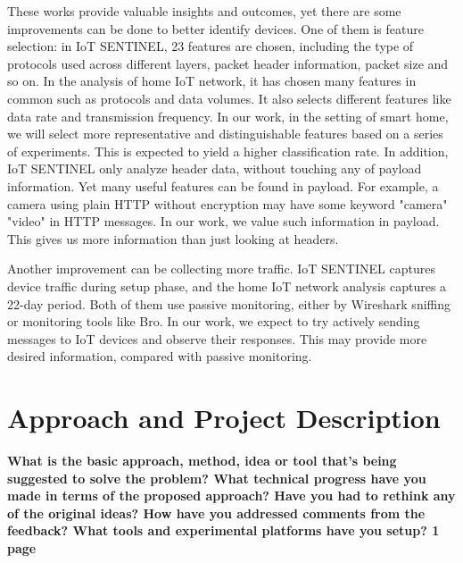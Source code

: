 \documentclass[twocolumn,10pt]{article}
\begin{document}
These works provide valuable insights and outcomes, yet there are some improvements can be done to better identify devices. One of them is feature selection: in IoT SENTINEL, 23 features are chosen, including the type of protocols used across different layers, packet header information, packet size and so on. In the analysis of home IoT network, it has chosen many features in common such as protocols and data volumes. It also selects different features like data rate and transmission frequency. In our work, in the setting of smart home, we will select more representative and distinguishable features based on a series of experiments. This is expected to yield a higher classification rate. In addition, IoT SENTINEL only analyze header data, without touching any of payload information. Yet many useful features can be found in payload. For example, a camera using plain HTTP without encryption may have some keyword "camera" "video" in HTTP messages. In our work, we value such information in payload. This gives us more information than just looking at headers.

Another improvement can be collecting more traffic. IoT SENTINEL captures device traffic during setup phase, and the home IoT network analysis captures a 22-day period. Both of them use passive monitoring, either by Wireshark sniffing or monitoring tools like Bro. In our work, we expect to try actively sending messages to IoT devices and observe their responses. This may provide more desired information, compared with passive monitoring.

\section{Approach and Project Description}

{\bf What is the basic approach, method, idea or tool that’s
being suggested to solve the problem? 
What technical progress have you made in terms of the proposed approach? 
Have you had to rethink any of the original ideas?  
How have you addressed comments from the feedback? 
What tools and experimental platforms have you setup? 1 page}
\end{document}
